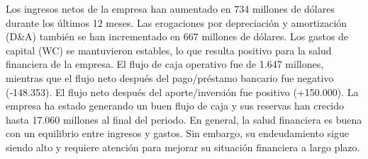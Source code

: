 
Los ingresos netos de la empresa han aumentado en 734 millones de dólares durante los últimos 12 meses. Las erogaciones por depreciación y amortización (D&A) también se han incrementado en 667 millones de dólares. Los gastos de capital (WC) se mantuvieron estables, lo que resulta positivo para la salud financiera de la empresa. El flujo de caja operativo fue de 1.647 millones, mientras que el flujo neto después del pago/préstamo bancario fue negativo (-148.353). El flujo neto después del aporte/inversión fue positivo (+150.000). La empresa ha estado generando un buen flujo de caja y sus reservas han crecido hasta 17.060 millones al final del periodo. En general, la salud financiera es buena con un equilibrio entre ingresos y gastos. Sin embargo, su endeudamiento sigue siendo alto y requiere atención para mejorar su situación financiera a largo plazo.
